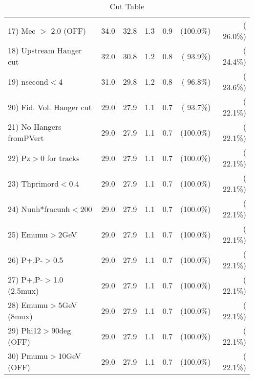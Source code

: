 \begin{table}[h!]
\begin{tabular}{||l||r|r|r|r|r|r||}
 17) Mee $>$ 2.0  (OFF)   &         34.0 &         32.8 &          1.3 &          0.9 & (100.0\%) & ( 26.0\%) \\
 18) Upstream Hanger cut  &         32.0 &         30.8 &          1.2 &          0.8 & ( 93.9\%) & ( 24.4\%) \\
 19) nsecond$<$4          &         31.0 &         29.8 &          1.2 &          0.8 & ( 96.8\%) & ( 23.6\%) \\
 20) Fid. Vol. Hanger cut &         29.0 &         27.9 &          1.1 &          0.7 & ( 93.7\%) & ( 22.1\%) \\
 21) No Hangers fromPVert &         29.0 &         27.9 &          1.1 &          0.7 & (100.0\%) & ( 22.1\%) \\
 22) Pz$>$0 for tracks    &         29.0 &         27.9 &          1.1 &          0.7 & (100.0\%) & ( 22.1\%) \\
 23) Thprimord$<$0.4      &         29.0 &         27.9 &          1.1 &          0.7 & (100.0\%) & ( 22.1\%) \\
 24) Nunh*fracunh$<$200   &         29.0 &         27.9 &          1.1 &          0.7 & (100.0\%) & ( 22.1\%) \\
 25) Emumu$>$2GeV         &         29.0 &         27.9 &          1.1 &          0.7 & (100.0\%) & ( 22.1\%) \\
 26) P+,P-$>$0.5          &         29.0 &         27.9 &          1.1 &          0.7 & (100.0\%) & ( 22.1\%) \\
 27) P+,P-$>$1.0 (2.5mux) &         29.0 &         27.9 &          1.1 &          0.7 & (100.0\%) & ( 22.1\%) \\
 28) Emumu$>$5GeV  (8mux) &         29.0 &         27.9 &          1.1 &          0.7 & (100.0\%) & ( 22.1\%) \\
 29) Phi12$>$90deg  (OFF) &         29.0 &         27.9 &          1.1 &          0.7 & (100.0\%) & ( 22.1\%) \\
 30) Pmumu$>$10GeV  (OFF) &         29.0 &         27.9 &          1.1 &          0.7 & (100.0\%) & ( 22.1\%) \\
 \hline
 \hline
 \end{tabular}
 \caption{Cut Table           }
 \label{tab-cutcohjpsi-mumu_cohrho0}
 \end{table}
